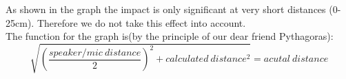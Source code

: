 As shown in the graph the impact is only significant at very short distances (0-25cm). Therefore we do not take this effect into account.\\
The function for the graph is(by the principle of our dear friend Pythagoras):\begin{equation}
\sqrt{\left(\frac{speaker/mic\ distance}{2}\right)^2+calculated\ distance^2}=acutal\ distance
\end{equation}